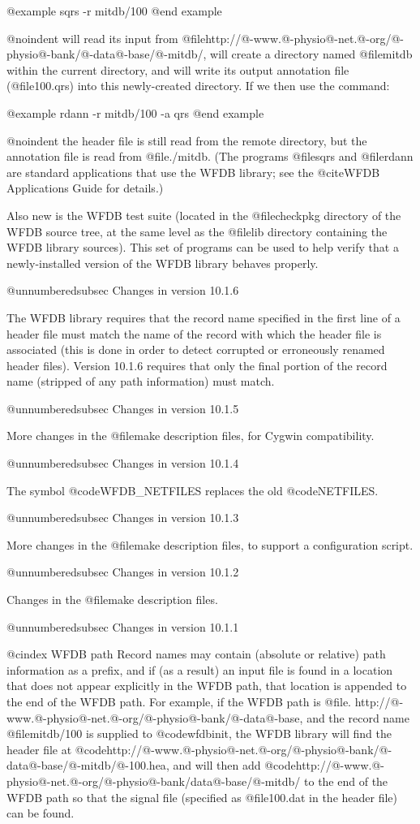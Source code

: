 @example
sqrs -r mitdb/100
@end example

@noindent
will read its input from
@file{http://@-www.@-physio@-net.@-org/@-physio@-bank/@-data@-base/@-mitdb/},
will create a directory named @file{mitdb} within the current directory, and
will write its output annotation file (@file{100.qrs}) into this newly-created
directory.  If we then use the command:

@example
rdann -r mitdb/100 -a qrs
@end example

@noindent
the header file is still read from the remote directory, but the annotation
file is read from @file{./mitdb}.  (The programs @file{sqrs} and @file{rdann}
are standard applications that use the WFDB library;  see the @cite{WFDB
Applications Guide} for details.)

Also new is the WFDB test suite (located in the @file{checkpkg} directory of
the WFDB source tree, at the same level as the @file{lib} directory containing
the WFDB library sources).  This set of programs can be used to help verify
that a newly-installed version of the WFDB library behaves properly.

@unnumberedsubsec Changes in version 10.1.6

The WFDB library requires that the record name specified in the first line
of a header file must match the name of the record with which the header file
is associated (this is done in order to detect corrupted or erroneously
renamed header files).  Version 10.1.6 requires that only the final portion of
the record name (stripped of any path information) must match.

@unnumberedsubsec Changes in version 10.1.5

More changes in the @file{make} description files, for Cygwin compatibility.

@unnumberedsubsec Changes in version 10.1.4

The symbol @code{WFDB_NETFILES} replaces the old @code{NETFILES}.

@unnumberedsubsec Changes in version 10.1.3

More changes in the @file{make} description files, to support a configuration
script.

@unnumberedsubsec Changes in version 10.1.2

Changes in the @file{make} description files.

@unnumberedsubsec Changes in version 10.1.1

@cindex WFDB path
Record names may contain (absolute or relative) path information as a prefix,
and if (as a result) an input file is found in a location that does not appear
explicitly in the WFDB path, that location is appended to the end of the WFDB
path.  For example, if the WFDB path is
@file{. http://@-www.@-physio@-net.@-org/@-physio@-bank/@-data@-base}, and the
record name @file{mitdb/100} is supplied to @code{wfdbinit}, the WFDB library
will find the header file at
@code{http://@-www.@-physio@-net.@-org/@-physio@-bank/@-data@-base/@-mitdb/@-100.hea},
and will then add @code{http://@-www.@-physio@-net.@-org/@-physio@-bank/data@-base/@-mitdb/} to
the end of the WFDB path so that the signal file (specified as @file{100.dat}
in the header file) can be found.

